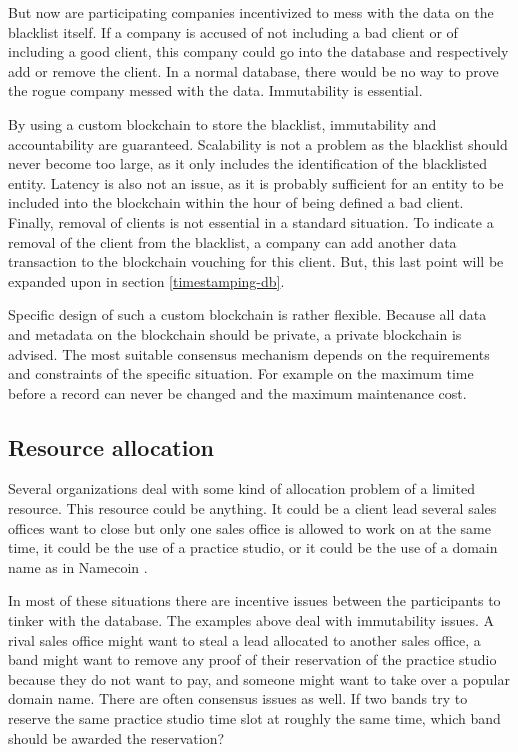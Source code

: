 But now are participating companies incentivized to mess with the data on the blacklist itself. If a company is accused of not including a bad client or of including a good client, this company could go into the database and respectively add or remove the client. In a normal database, there would be no way to prove the rogue company messed with the data. Immutability is essential.

By using a custom blockchain to store the blacklist, immutability and accountability are guaranteed. Scalability is not a problem as the blacklist should never become too large, as it only includes the identification of the blacklisted entity. Latency is also not an issue, as it is probably sufficient for an entity to be included into the blockchain within the hour of being defined a bad client. Finally, removal of clients is not essential in a standard situation. To indicate a removal of the client from the blacklist, a company can add another data transaction to the blockchain vouching for this client. But, this last point will be expanded upon in section \ref{timestamping-db}.

Specific design of such a custom blockchain is rather flexible. Because all data and metadata on the blockchain should be private, a private blockchain is advised. The most suitable consensus mechanism depends on the requirements and constraints of the specific situation. For example on the maximum time before a record can never be changed and the maximum maintenance cost.

\subsection{Resource allocation}

Several organizations deal with some kind of allocation problem of a limited resource. This resource could be anything. It could be a client lead several sales offices want to close but only one sales office is allowed to work on at the same time, it could be the use of a practice studio, or it could be the use of a domain name as in Namecoin \cite{namecoin-whitepaper}. 

In most of these situations there are incentive issues between the participants to tinker with the database. The examples above deal with immutability issues. A rival sales office might want to steal a lead allocated to another sales office, a band might want to remove any proof of their reservation of the practice studio because they do not want to pay, and someone might want to take over a popular domain name. There are often consensus issues as well. If two bands try to reserve the same practice studio time slot at roughly the same time, which band should be awarded the reservation?

